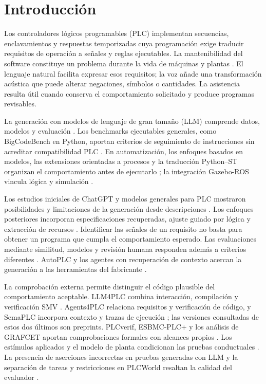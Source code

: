 \documentclass[a4paper,fleqn]{cas-dc}
\newcommand{\TituloIntroduccion}{Introducción}
\newcommand{\TituloIntroduccion}{Introduction}
\begin{document}
\section{\TituloIntroduccion}
\label{sec:intro}
Los controladores lógicos programables (PLC) implementan secuencias, enclavamientos y respuestas temporizadas cuya programación exige traducir requisitos de operación a señales y reglas ejecutables. La mantenibilidad del software constituye un problema durante la vida de máquinas y plantas \citep{vogelheuser2018maintainability}. El lenguaje natural facilita expresar esos requisitos; la voz añade una transformación acústica que puede alterar negaciones, símbolos o cantidades. La asistencia resulta útil cuando conserva el comportamiento solicitado y produce programas revisables.

La generación con modelos de lenguaje de gran tamaño (LLM) comprende datos, modelos y evaluación \citep{jiang2026survey}. Los benchmarks ejecutables generales, como BigCodeBench en Python, aportan criterios de seguimiento de instrucciones sin acreditar compatibilidad PLC \citep{zhuo2025bigcodebench}. En automatización, los enfoques basados en modelos, las extensiones orientadas a procesos y la traducción Python--ST organizan el comportamiento antes de ejecutarlo \citep{obermeier2015model,bashev2020post,zhao2024py2st}; la integración Gazebo-ROS vincula lógica y simulación \citep{kim2020gazebo}.

Los estudios iniciales de ChatGPT y modelos generales para PLC mostraron posibilidades y limitaciones de la generación desde descripciones \citep{koziolek2023chatgpt,tran2024universal}. Los enfoques posteriores incorporan especificaciones recuperadas, ajuste guiado por lógica y extracción de recursos \citep{koziolek2024rag,ren2025metaindux,boudribila2025requirements}. Identificar las señales de un requisito no basta para obtener un programa que cumpla el comportamiento esperado. Las evaluaciones mediante similitud, modelos y revisión humana responden además a criterios diferentes \citep{adnyana2026prompting}. AutoPLC y los agentes con recuperación de contexto acercan la generación a las herramientas del fabricante \citep{yang2025autoplc,kersting2025vendor}.

La comprobación externa permite distinguir el código plausible del comportamiento aceptable. LLM4PLC combina interacción, compilación y verificación SMV \citep{fakih2024llm4plc}. Agents4PLC relaciona requisitos y verificación de código, y SemaPLC incorpora contexto y trazas de ejecución \citep{liu2024agents4plc,tu2026semaplc}; las versiones consultadas de estos dos últimos son preprints. PLCverif, ESBMC-PLC+ y los análisis de GRAFCET aportan comprobaciones formales con alcances propios \citep{blanco2020plcverif,dantas2026esbmc,schnakenbeck2026comparison}. Los estímulos aplicados y el modelo de planta condicionan las pruebas conductuales \citep{ma2019plantfeatures}. La presencia de aserciones incorrectas en pruebas generadas con LLM y la separación de tareas y restricciones en PLCWorld resaltan la calidad del evaluador \citep{koziolek2024tests,kim2026plcworld}.
\end{document}
